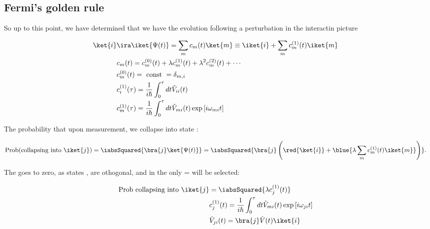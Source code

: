 \subsection{Fermi's golden rule}
\begin{framed}\noindent
  So up  to this point,  we have determined  that we have  the evolution
  following a perturbation in the interactin picture

  \begin{equation}
    \begin{aligned}
      \ket{i} & \ira \iket{\Psi(t)} = \sum_m c_m(t)\ket{m} \equiv \iket{i} + \sum_m c_{m}^{(1)}(t)\iket{m}\\
      & c_{m}(t) = c_{m}^{(0)}(t)+\lambda c_{m}^{(1)}(t)+\lambda^2c_m^{(2)}(t)+\cdots\\
      & c_{m}^{(0)}(t) = \text{ const } = \delta_{m,i}\\
      & c_{i}^{(1)}(\tau) = \frac{1}{i\hbar}\int_{0}^{\tau}dt\hat{V}_{ii}(t)\\
      &                         c_{m}^{(1)}(\tau)                         =
      \frac{1}{i\hbar}\int_{0}^{\tau}dt\hat{V}_{mi}(t)\exp\left[i\omega_{mi}t\right]
    \end{aligned}
  \end{equation}

\end{framed}

\noindent The probability that upon  measurement, we collapse into state
:

\begin{equation}
  \begin{aligned}
    \text{Prob(collapsing      into      $      \iket{j}      $)}      =
    \iabsSquared{\bra{j}\ket{\Psi(t)}}                                    =
    \iabsSquared{\bra{j}\left(\red{\ket{i}}     +    \blue{\lambda\sum_m
          c_{m}^{(1)}(t)\iket{m}}\right)}.
  \end{aligned}
\end{equation}

\noindent  The    goes to  zero,  as  states  ,
   are   othogonal,  and   in   the      only
= will be selected:

\begin{framed}\noindent
  \begin{equation}
    \begin{aligned}
      \text{Prob collapsing into $ \iket{j} $} & = \iabsSquared{\lambda c_j^{(1)}(t)}\\
      & c_j^{(1)}(t) = \frac{1}{i\hbar}\int_{0}^{\tau}dt\hat{V}_{mi}(t)\exp\left[i\omega_{ji}t\right]\\
      & \hat{V}_{ji}(t) = \bra{j}\hat{V}(t)\iket{i}
    \end{aligned}
  \end{equation}
\end{framed}

